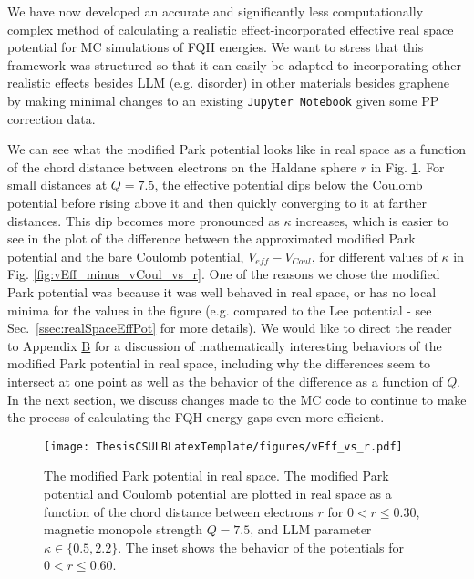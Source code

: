     We have now developed an accurate and significantly less computationally complex method of calculating a realistic effect-incorporated effective real space potential for MC simulations of FQH energies. We want to stress that this framework was structured so that it can easily be adapted to incorporating other realistic effects besides LLM (e.g. disorder) in other materials besides graphene by making minimal changes to an existing \texttt{Jupyter Notebook} given some PP correction data.
    
    We can see what the modified Park potential looks like in real space as a function of the chord distance between electrons on the Haldane sphere $r$ in Fig. \ref{fig:vEff_vs_r}. For small distances at $Q=7.5$, the effective potential dips below the Coulomb potential before rising above it and then quickly converging to it at farther distances. This dip becomes more pronounced as $\kappa$ increases, which is easier to see in the plot of the difference between the approximated modified Park potential and the bare Coulomb potential, $V_{eff}-V_{Coul}$, for different values of $\kappa$ in Fig. \ref{fig:vEff_minus_vCoul_vs_r}. One of the reasons we chose the modified Park potential was because it was well behaved in real space, or has no local minima for the values in the figure (e.g. compared to the Lee potential - see Sec.~\ref{ssec:realSpaceEffPot} for more details). We would like to direct the reader to Appendix \hyperref[appendixB]{B} for a discussion of mathematically interesting behaviors of the modified Park potential in real space, including why the differences seem to intersect at one point as well as the behavior of the difference as a function of $Q$. In the next section, we discuss changes made to the MC code to continue to make the process of calculating the FQH energy gaps even more efficient.
    
    \begin{figure}[H]
    \begin{center}
    \texttt{[image: ThesisCSULBLatexTemplate/figures/vEff\_vs\_r.pdf]}
    \caption[The modified Park potential in real space.]{The modified Park potential in real space. The modified Park potential and Coulomb potential are plotted in real space as a function of the chord distance between electrons $r$ for $0<r\leq0.30$, magnetic monopole strength $Q=7.5$, and LLM parameter $\kappa\in\{0.5,2.2\}$. The inset shows the behavior of the potentials for $0<r\leq0.60$.}
    \label{fig:vEff_vs_r} 
    \end{center}
    \end{figure}
    
